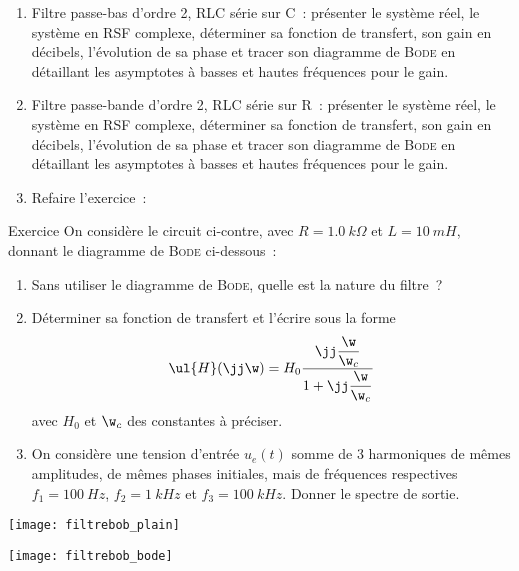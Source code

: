 \documentclass[a4paper, 12pt, final, garamond]{book}
\begin{document}
\begin{enumerate}
    \item Filtre passe-bas d'ordre 2, RLC série sur C~: présenter le système
        réel, le système en RSF complexe, déterminer sa fonction de transfert,
        son gain en décibels, l'évolution de sa phase et tracer son diagramme de
        \textsc{Bode} en détaillant les asymptotes à basses et hautes fréquences
        pour le gain.

    \item Filtre passe-bande d'ordre 2, RLC série sur R~: présenter le système
        réel, le système en RSF complexe, déterminer sa fonction de transfert,
        son gain en décibels, l'évolution de sa phase et tracer son diagramme de
        \textsc{Bode} en détaillant les asymptotes à basses et hautes fréquences
        pour le gain.

    \item Refaire l'exercice~:
\end{enumerate}
\begin{NCexem}[]{Exercice}
    On considère le circuit ci-contre, avec $R = \SI{1.0}{k\Omega}$ et $L =
    \SI{10}{mH}$, donnant le diagramme de \textsc{Bode} ci-dessous~:

    \begin{minipage}{0.60\linewidth}
        \begin{enumerate}
            \item Sans utiliser le diagramme de \textsc{Bode}, quelle est la
                nature du filtre~?
            \item Déterminer sa fonction de transfert et l'écrire sous la forme
                \[\ul{H}(\jj\w) = H_0 \frac{\jj\dfrac{\w}{\w_c}}{1 +
                \jj\dfrac{\w}{\w_c}}\] avec $H_0$ et $\w_c$ des constantes à
                préciser.
            \item On considère une tension d'entrée $u_e(t)$ somme de 3
                harmoniques de mêmes amplitudes, de mêmes phases initiales, mais
                de fréquences respectives $f_1 = \SI{100}{Hz}$, $f_2 =
                \SI{1}{kHz}$ et $f_3 = \SI{100}{kHz}$. Donner le spectre de
                sortie.
        \end{enumerate}
    \end{minipage}
    \hfill
    \begin{minipage}{0.35\linewidth}
        \begin{center}
            \hspace{10pt}\texttt{[image: filtrebob\_plain]}
        \end{center}
        \begin{center}
            \texttt{[image: filtrebob\_bode]}
        \end{center}
    \end{minipage}
\end{NCexem}
\end{document}

